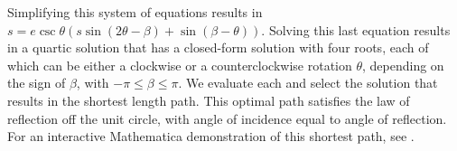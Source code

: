  Simplifying this system of equations results in $s=e \csc \theta (s \sin(2 \theta-\beta)+\sin(\beta-\theta))$. Solving this last equation results in a quartic solution that has a closed-form solution with four roots, each of which can be either a clockwise or a counterclockwise rotation $\theta$, depending on the sign of $\beta$, with $-\pi\leq\beta\leq\pi$. We evaluate each and select the solution that results in the shortest length path. This optimal path satisfies the law of reflection off the unit circle, with angle of incidence equal to angle of reflection. For an interactive Mathematica demonstration of this shortest path, see \cite{shortestPathMathematica}.
 
  
 